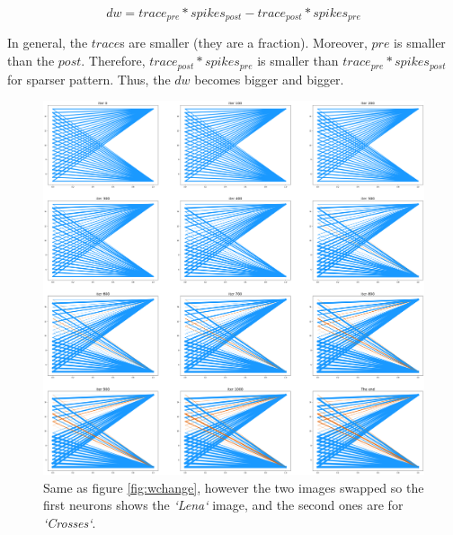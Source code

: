 \documentclass{article}
\begin{document}
	\begin{equation}
		dw = trace_{pre} * spikes_{post} - trace_{post} * spikes_{pre}
		\label{eq:dw}
	\end{equation} 
	
	In general, the $trace$s are smaller (they are a fraction). Moreover, $pre$ is smaller than the $post$. Therefore, $trace_{post} * spikes_{pre}$ is smaller than $trace_{pre} * spikes_{post}$ for sparser pattern. Thus, the $dw$ becomes bigger and bigger.
	\begin{figure}
		\includegraphics[width=\textwidth]{weight_change_reverse.png}
		\caption{Same as figure \ref{fig:wchange}, however the two images swapped so the first neurons shows the \textit{`Lena`} image, and the second ones are for \textit{`Crosses`}.}
		\label{fig:wchangerev}
	\end{figure}
\end{document}
